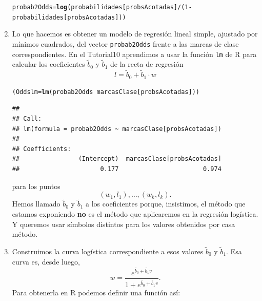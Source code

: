 \documentclass[10pt,a4paper]{article}\usepackage[]{graphicx}\usepackage[]{color}
\makeatletter
\newcommand{\hlnum}[1]{\textcolor[rgb]{0.686,0.059,0.569}{#1}}%
\newcommand{\hlopt}[1]{\textcolor[rgb]{0,0,0}{#1}}%
\newcommand{\hlstd}[1]{\textcolor[rgb]{0.345,0.345,0.345}{#1}}%
\newcommand{\hlkwb}[1]{\textcolor[rgb]{0.69,0.353,0.396}{#1}}%
\newcommand{\hlkwd}[1]{\textcolor[rgb]{0.737,0.353,0.396}{\textbf{#1}}}%
\newenvironment{kframe}{%
 \def\at@end@of@kframe{}%
 \ifinner\ifhmode%
  \def\at@end@of@kframe{\end{minipage}}%
  \begin{minipage}{\columnwidth}%
 \fi\fi%
 \def\FrameCommand##1{\hskip\@totalleftmargin \hskip-\fboxsep
 \colorbox{shadecolor}{##1}\hskip-\fboxsep
     \hskip-\linewidth \hskip-\@totalleftmargin \hskip\columnwidth}%
 \MakeFramed {\advance\hsize-\width
   \@totalleftmargin\z@ \linewidth\hsize
   \@setminipage}}%
 {\par\unskip\endMakeFramed%
 \at@end@of@kframe}
\newenvironment{knitrout}{}{} %
\makeatother
\begin{document}
\begin{enumerate}
\begin{knitrout}
\color{fgcolor}\begin{kframe}
\begin{alltt}
\hlstd{probab2Odds} \hlkwb{=} \hlkwd{log}\hlstd{(probabilidades[probsAcotadas]}\hlopt{/}\hlstd{(}\hlnum{1}\hlopt{-}\hlstd{probabilidades[probsAcotadas]))}
\end{alltt}
\end{kframe}
\end{knitrout}

\item Lo que hacemos es obtener un modelo de regresión lineal simple, ajustado por mínimos cuadrados, del vector {\tt probab2Odds} frente a las marcas de clase correspondientes. En el Tutorial10 aprendimos a usar la función {\tt lm} de R para calcular los coeficientes $\widetilde b_0$ y $\widetilde b_1$ de la recta de regresión
\[l = \widetilde b_0 +\widetilde b_1\cdot w\]

\begin{knitrout}
\color{fgcolor}\begin{kframe}
\begin{alltt}
\hlstd{(Oddslm} \hlkwb{=} \hlkwd{lm}\hlstd{(probab2Odds} \hlopt{~} \hlstd{marcasClase[probsAcotadas]))}
\end{alltt}
\begin{verbatim}
## 
## Call:
## lm(formula = probab2Odds ~ marcasClase[probsAcotadas])
## 
## Coefficients:
##                (Intercept)  marcasClase[probsAcotadas]  
##                      0.177                       0.974
\end{verbatim}
\end{kframe}
\end{knitrout}

para los puntos
\[(w_1,l_1),\ldots,(w_k,l_k).\]
Hemos llamado $\widetilde b_0$ y $\widetilde b_1$ a los coeficientes porque, insistimos, el método que estamos exponiendo {\bf no} es el método que aplicaremos en la regresión logística. Y queremos usar símbolos distintos para los valores obtenidos por casa método.

\item Construimos la curva logística correspondiente a esos valores $\widetilde b_0$ y $\widetilde b_1$. Esa curva es, desde luego,
\[
  w = \dfrac{e^{\widetilde{b_0} + \widetilde{b_1} v}}{1 + e^{\widetilde{b_0} + \widetilde{b_1} v}}.
\]
Para obtenerla en R podemos definir una función así:


\end{enumerate}
\end{document}
